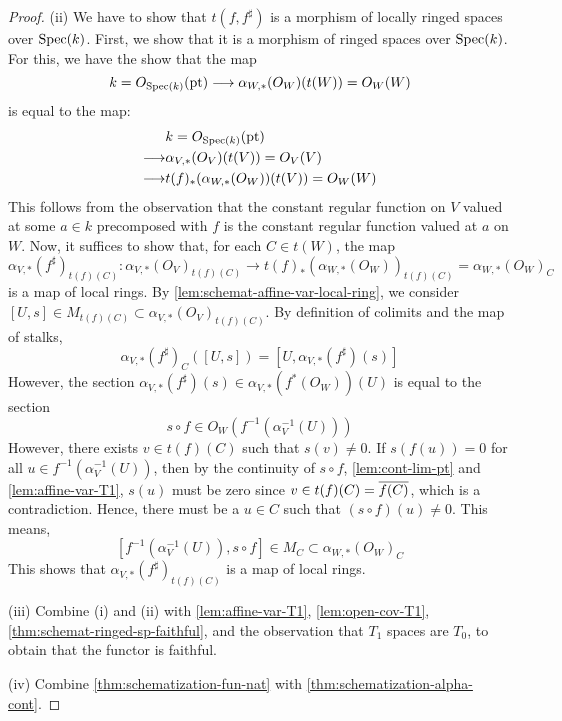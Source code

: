 \begin{proof}
(ii)
We have to show that $t(f, f^\sharp)$ is a morphism of locally
ringed spaces over $\mathrm{Spec}(k)$. First, we show that it is a morphism
of ringed spaces over $\mathrm{Spec}(k)$. For this, we have the show that the
map
\[
k = O_{\Spec(k)}(\mathrm{pt}) \to \alpha_{W, *}(O_W)(t(W)) = O_W(W)
\]
is equal to the map:
\begin{align*}
   & k = O_{\Spec(k)}(\mathrm{pt}) \\
\to& \alpha_{V, *}(O_V)(t(V)) = O_V(V) \\
\to& t(f)_*(\alpha_{W, *}(O_W))(t(V)) = O_W(W)
\end{align*}
This follows from the observation that the constant regular function
on $V$ valued at some $a \in k$ precomposed with $f$ is the constant
regular function valued at $a$ on $W$.
Now, it suffices to show that, for each $C \in t(W)$, the map
\[
\alpha_{V, *}(f^\sharp)_{t(f)(C)} :
    \alpha_{V, *}(O_V)_{t(f)(C)} \to
    t(f)_*(\alpha_{W, *}(O_W))_{t(f)(C)} = \alpha_{W, *}(O_W)_{C}
\]
is a map of local rings.
By \cref{lem:schemat-affine-var-local-ring}, we consider
$[U, s] \in M_{t(f)(C)} \subset \alpha_{V, *}(O_V)_{t(f)(C)}$.
By definition of colimits and the map of stalks,
\[
\alpha_{V, *}(f^\sharp)_C([U, s]) = [U, \alpha_{V, *}(f^\sharp)(s)]
\]
However, the section $\alpha_{V, *}(f^\sharp)(s) \in \alpha_{V, *}(f^*(O_W))(U)$
is equal to the section
\[
s \circ f \in O_W(f^{-1}(\alpha_{V}^{-1}(U)))
\]
However, there exists $v \in t(f)(C)$ such that $s(v) \neq 0$.
If $s(f(u)) = 0$ for all $u \in f^{-1}(\alpha_V^{-1}(U))$,
then by the continuity of $s \circ f$, \cref{lem:cont-lim-pt} and
\cref{lem:affine-var-T1}, $s(u)$ must be zero since
$v \in t(f)(C) = \cls{f(C)}$,
which is a contradiction. Hence, there must be a $u \in C$ such that
$(s \circ f)(u) \neq 0$. This means,
\[
[f^{-1}(\alpha_{V}^{-1}(U)), s \circ f] \in M_C \subset \alpha_{W, *}(O_W)_C
\]
This shows that $\alpha_{V, *}(f^\sharp)_{t(f)(C)}$ is a map of local rings.

(iii)
Combine (i) and (ii) with
\cref{lem:affine-var-T1},
\cref{lem:open-cov-T1},
\cref{thm:schemat-ringed-sp-faithful},
and the observation that $T_1$ spaces are $T_0$, to obtain
that the functor is faithful. 

(iv)
Combine \cref{thm:schematization-fun-nat} with
\cref{thm:schematization-alpha-cont}.
\end{proof}
